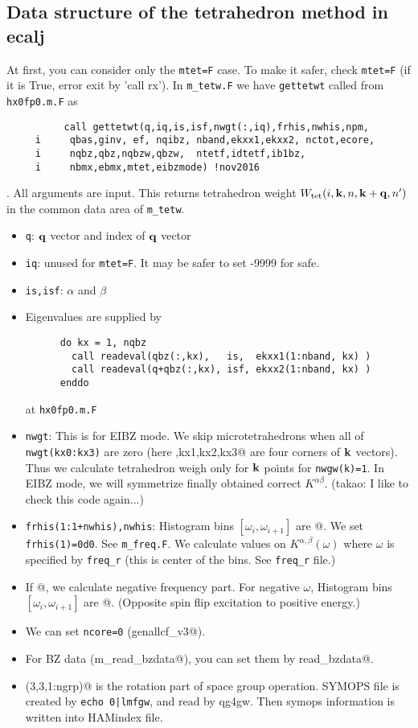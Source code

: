 \documentclass[a4paper,10pt,fleqn]{article}
\newcommand{\bfq}{{\bf q}}
\newcommand{\bfk}{{\bf k}}
\begin{document}
\subsection{Data structure of the tetrahedron method in ecalj}
\label{sec:mag1}
At first, you can consider only the \verb+mtet=F+ case.
To make it safer, check \verb+mtet=F+ (if it is True, error exit by 'call rx').
In \verb+m_tetw.F+ we have \verb#gettetwt# called from \verb#hx0fp0.m.F# as
\begin{verbatim}
          call gettetwt(q,iq,is,isf,nwgt(:,iq),frhis,nwhis,npm,
     i     qbas,ginv, ef, nqibz, nband,ekxx1,ekxx2, nctot,ecore,
     i     nqbz,qbz,nqbzw,qbzw,  ntetf,idtetf,ib1bz,
     i     nbmx,ebmx,mtet,eibzmode) !nov2016
\end{verbatim}
. All arguments are input. 
This returns tetrahedron weight $W_{\rm tet}(i,\bfk,n,\bfk+\bfq,n')$
in the common data area of \verb+m_tetw+.\\
\begin{itemize}
\item
\verb+q+: $\bfq$ vector and index of $\bfq$ vector
\item
\verb+iq+: unused for \verb+mtet=F+. It may be safer to set -9999 for safe.
\item
\verb+is,isf+: $\alpha$ and $\beta$
\item
Eigenvalues are supplied by
\begin{verbatim}
      do kx = 1, nqbz
        call readeval(qbz(:,kx),   is,  ekxx1(1:nband, kx) ) 
        call readeval(q+qbz(:,kx), isf, ekxx2(1:nband, kx) )
      enddo
\end{verbatim}
at \verb#hx0fp0.m.F#
\item
\verb+nwgt+: This is for EIBZ mode. 
We skip microtetrahedrons when all of \verb+nwgt(kx0:kx3)+
are zero (here ,kx1,kx2,kx3@ are four corners of $\bfk$ vectors).
Thus we calculate tetrahedron weigh only for $\bfk$ points for \verb+nwgw(k)=1+.
In EIBZ mode, we will symmetrize finally obtained correct $K^{\alpha\beta}$.
(takao: I like to check this code again...)\\
\item
\verb#frhis(1:1+nwhis),nwhis#: Histogram bins $[\omega_i,\omega_{i+1}]$
are @. We set \verb+frhis(1)=0d0+.
See \verb+m_freq.F+. We calculate values on $K^{\alpha,\beta}(\omega)$ where
$\omega$ is specified by \verb+freq_r+ (this is center of the bins. 
See \verb+freq_r+ file.)
\item
If @, we calculate negative frequency part. For negative $\omega$, 
Histogram bins $[\omega_i,\omega_{i+1}]$
are @.
(Opposite spin flip excitation to positive energy.)
\item
We can set \verb+ncore=0+ (\verb@use genallcf_v3@).
\item
For BZ data (\verb@use m_read_bzdata@), you can set them
by \verb@call read_bzdata@.
\item
\verb@symops(3,3,1:ngrp)@ is the rotation part of space group operation.
SYMOPS file is created by \verb#echo 0|lmfgw#, and read by qg4gw.
Then symops information is written into HAMindex file.
\end{itemize}
\end{document}
